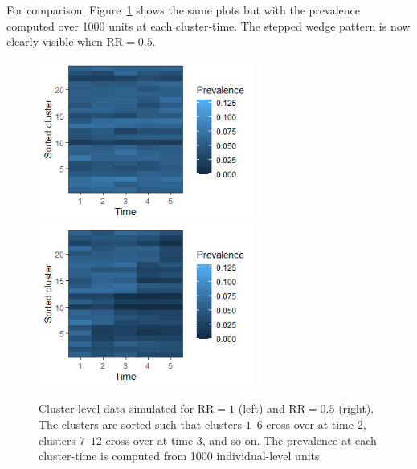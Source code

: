 \documentclass[10pt]{article}
\begin{document}
For comparison, Figure~\ref{fig:data1000} shows the same plots but with the prevalence computed over 1000 units at each cluster-time. The stepped wedge pattern is now clearly visible when $\text{RR}=0.5$.

\begin{figure}[H]
\centering
\includegraphics[width=7.1cm]{data1_1000.png}
\includegraphics[width=7.1cm]{data05_1000.png}
\caption{Cluster-level data simulated for $\text{RR}=1$ (left) and $\text{RR}=0.5$ (right). The clusters are sorted such that clusters $1$--$6$ cross over at time 2, clusters $7$--$12$ cross over at time 3, and so on. The prevalence at each cluster-time is computed from 1000 individual-level units.}
\label{fig:data1000}
\end{figure}
\end{document}

